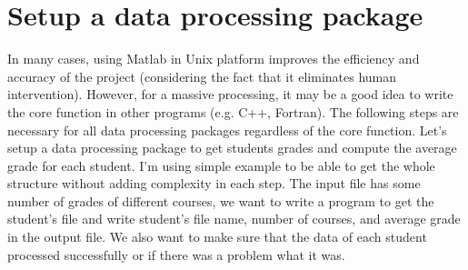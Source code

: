 \section{Setup a data processing package}

In many cases, using Matlab in Unix platform improves the efficiency and accuracy of the project (considering the fact that it eliminates human intervention). However, for a massive processing, it may be a good idea to write the core function in other programs (e.g. C++, Fortran). The following steps are necessary for all data processing packages regardless of the core function. Let's setup a data processing package to get students grades and compute the average grade for each student. I'm using simple example to be able to get the whole structure without adding complexity in each step. The input file has some number of grades of different courses, we want to write a program to get the student's file and write student's file name, number of courses, and average grade in the output file. We also want to make sure that the data of each student processed successfully or if there was a problem what it was. \\






 


